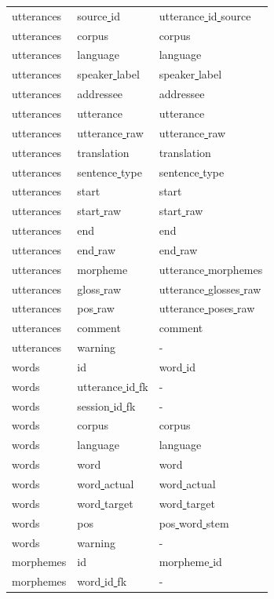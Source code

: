 \documentclass[a4paper, 11pt]{book}
\newcommand{\und}{\underline{{ }}\hspace{0.2mm}}	%
\begin{document}
\begin{longtable}[ht!]{lll}
		utterances				& source\und id			& utterance\und id\und source \\
		utterances				& corpus				& corpus \\
		utterances				& language				& language \\
		utterances				& speaker\und label		& speaker\und label \\
		utterances				& addressee				& addressee \\
		utterances				& utterance				& utterance \\
		utterances				& utterance\und raw		& utterance\und raw \\
		utterances				& translation			& translation \\
		utterances				& sentence\und type		& sentence\und type \\
		utterances				& start					& start \\
		utterances				& start\und raw			& start\und raw \\
		utterances				& end					& end \\
		utterances				& end\und raw			& end\und raw \\
		utterances				& morpheme				& utterance\und morphemes \\
		utterances				& gloss\und raw			& utterance\und glosses\und raw \\
		utterances				& pos\und raw			& utterance\und poses\und raw \\
		utterances				& comment				& comment \\
		utterances				& warning				& - \\
		words					& id					& word\und id \\
		words					& utterance\und id\und fk & - \\
		words					& session\und id\und fk	& - \\
		words					& corpus				& corpus \\
		words					& language				& language \\
		words					& word					& word \\
		words					& word\und actual		& word\und actual \\
		words					& word\und target		& word\und target \\
		words					& pos					& pos\und word\und stem \\
		words					& warning				& - \\
		morphemes				& id					& morpheme\und id \\
		morphemes				& word\und id\und fk	& - \\

\end{longtable}
\end{document}
